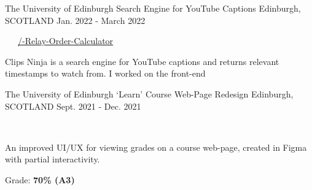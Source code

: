 \begin{cventries}
  \cventry
    {The University of Edinburgh} %
    {Search Engine for YouTube Captions} %
    {Edinburgh, SCOTLAND} %
    {Jan. 2022 - March 2022} %
    {
      \color{awesome}   \color{graytext}\ \ \ \href{https://github.com/chrisjpm/YouTube-Caption-Search-Engine}{\faGithub\acvHeaderIconSep\@chrisjpm/\@Swimming-Relay-Order-Calculator}\ \ \ \href{https://clipsninja.netlify.app/home}{\faGlobe\acvHeaderIconSep\@Website}
      \vspace{1.6em}
      \begin{cvitems} %
        \item Clips Ninja is a search engine for YouTube captions and returns relevant timestamps to watch from. I worked on the front-end
      \end{cvitems}
    }
    
  \cventry
    {The University of Edinburgh} %
    {`Learn' Course Web-Page Redesign} %
    {Edinburgh, SCOTLAND} %
    {Sept. 2021 - Dec. 2021} %
    {
      \color{awesome}\color{graytext}\ \ \ \href{https://www.figma.com/proto/Q6wnTtZs5rP21QqnWcJBP6/G42-CW3?node-id=0\%3A1}{\faFigma\acvHeaderIconSep\@Prototype}
      \vspace{1.6em}
      \begin{cvitems} %
        \item An improved UI/UX for viewing grades on a course web-page, created in Figma with partial interactivity.
        \item Grade: \textbf{70\% (A3)}
      \end{cvitems}
    }
    

\end{cventries}
